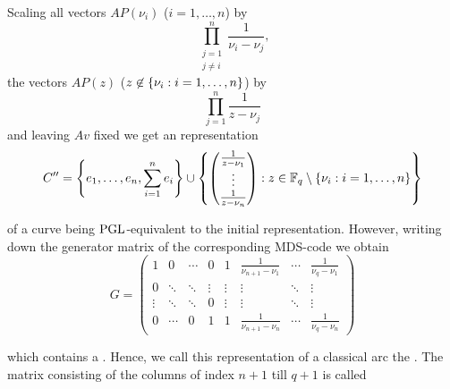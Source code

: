 Scaling all vectors $AP(\nu_i)$ ($i=1,\ldots,n$) by
$$ \prod_{\substack{j=1\\ j\neq i}}^n{\frac{1}{\nu_i-\nu_j}}\textrm{,} $$
the vectors $AP(z)$ ($z\not\in\left\{\nu_i:i=1,\ldots,n\right\}$) by 
$$ \prod_{j=1}^n{\frac{1}{z-\nu_j}} $$
and leaving $Av$ fixed we get an representation
$$ C'' = \left\{e_1,\ldots,e_n,\sum_{i=1}^n{e_i}\right\}\cup\left\{\begin{pmatrix} \frac{1}{z-\nu_1} \\ \vdots\\ \frac{1}{z-\nu_n}\end{pmatrix}:z\in\mathbb{F}_{q}\setminus\left\{\nu_i:i=1,\ldots,n\right\}\right\} $$

of a curve being $\mathrm{PGL}$-equivalent to the initial representation.
However, writing down the generator matrix of the corresponding MDS-code we obtain
$$ G =
    \begin{pmatrix}
        1      & 0      & \cdots & 0      & 1      & \frac{1}{\nu_{n+1}-\nu_1} & \cdots & \frac{1}{\nu_q-\nu_1} \\
        0      & \ddots & \ddots & \vdots & \vdots & \vdots                & \ddots & \vdots            \\
        \vdots & \ddots & \ddots & 0      & \vdots & \vdots                & \ddots & \vdots            \\
        0      & \cdots & 0      & 1      & 1      & \frac{1}{\nu_{n+1}-\nu_n} & \cdots & \frac{1}{\nu_q-\nu_n}
    \end{pmatrix} $$

which contains a . Hence, we call this representation of a classical arc the . The matrix consisting of the columns of index $n+1$ till $q+1$ is called \label{cauchy-rep}
